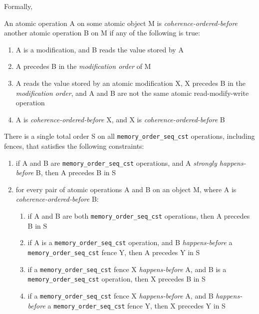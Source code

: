 \documentclass[a4paper,12pt,notitlepage,twoside,openright]{article}
\begin{document}
\begin{oframed}
\marginnote{\textcolor{ForestGreen}{(since C++20)}}
Formally,

An atomic operation A on some atomic object M is
\emph{coherence-ordered-before} another atomic operation B on M if any
of the following is true:

\begin{enumerate}

\item
  A is a modification, and B reads the value stored by A
\item
  A precedes B in the \emph{modification order} of M
\item
  A reads the value stored by an atomic modification X, X precedes B in
  the \emph{modification order}, and A and B are not the same atomic
  read-modify-write operation
\item
  A is \emph{coherence-ordered-before} X, and X is
  \emph{coherence-ordered-before} B
\end{enumerate}

There is a single total order S on all \texttt{memory\_order\_seq\_cst}
operations, including fences, that satisfies the following constraints:

\begin{enumerate}

\item
  if A and B are \texttt{memory\_order\_seq\_cst} operations, and A
  \emph{strongly happens-before} B, then A precedes B in S
\item
  for every pair of atomic operations A and B on an object M, where A is
  \emph{coherence-ordered-before} B:

  \begin{enumerate}

  \item
    if A and B are both \texttt{memory\_order\_seq\_cst} operations, then A
    precedes B in S
  \item
    if A is a \texttt{memory\_order\_seq\_cst} operation, and B
    \emph{happens-before} a \texttt{memory\_order\_seq\_cst} fence Y, then A
    precedes Y in S
  \item
    if a \texttt{memory\_order\_seq\_cst} fence X \emph{happens-before} A, and B
    is a \texttt{memory\_order\_seq\_cst} operation, then X precedes B in S
  \item
    if a \texttt{memory\_order\_seq\_cst} fence X \emph{happens-before} A, and B
    \emph{happens-before} a \texttt{memory\_order\_seq\_cst} fence Y, then X
    precedes Y in S
  \end{enumerate}
\end{enumerate}


\end{oframed}
\end{document}
